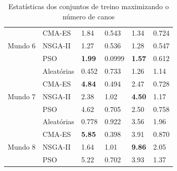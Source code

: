 \begin{table}[h]
\begin{tabular}{|p{2cm}|p{3cm}|p{2cm}|p{2cm}|p{2cm}|p{2cm}|}
        & CMA-ES & 1.84 & 0.543 & 1.34 & 0.724 \\
        Mundo 6 & NSGA-II & 1.27 & 0.536 & 1.28 & 0.547 \\
	& PSO & \textbf{1.99} & 0.0999 & \textbf{1.57} & 0.612 \\
        \hline
        & Aleatórias & 0.452 & 0.733 & 1.26 & 1.14 \\
	& CMA-ES & \textbf{4.84} & 0.494 & 2.47 & 0.728 \\
	Mundo 7 & NSGA-II & 2.38 & 1.02 & \textbf{4.50} & 1.17 \\
        &  PSO & 4.62 & 0.705 & 2.50 & 0.758 \\
        \hline
        &  Aleatórias & 0.778 & 0.922 & 3.56 & 1.96 \\
	& CMA-ES & \textbf{5.85} & 0.398 & 3.91 & 0.870 \\
	Mundo 8 & NSGA-II & 1.64 & 1.01 & \textbf{9.86} & 2.05 \\
        & PSO & 5.22 & 0.702 & 3.93 & 1.37 \\
        \hline
    \end{tabular}
    \caption{Estatísticas dos conjuntos de treino maximizando o número de canos}
    \label{tab:conjunto_treino_pipe}
\end{table}


